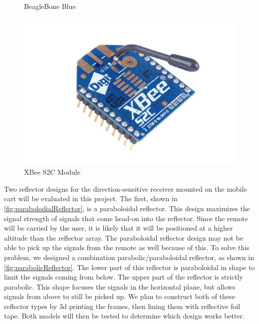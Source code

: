 \documentclass[letterpaper,12pt]{article}   %
\begin{document}
\begin{figure}
\begin{minipage}[t]{0.32\textwidth}
    \captionsetup{width=\textwidth}
    \caption{BeagleBone Blue}
    \label{fig:beagleboneBlue}
  \end{minipage}
  \begin{minipage}[t]{0.32\textwidth}
    \includegraphics[width=1\textwidth]{figs/img/Xbee-S2C-Module}
    \captionsetup{width=\textwidth}
    \caption{XBee S2C Module}
    \label{fig:XBeeModule}
  \end{minipage}
\end{figure}

\vspace*{12pt}
\noindent
Two reflector designs for the direction-sensitive receiver mounted on the mobile cart will be evaluated in this project. The first, shown in \autoref{fig:parabolodialReflector}, is a paraboloidal reflector. This design maximizes the signal strength of signals that come head-on into the reflector. Since the remote will be carried by the user, it is likely that it will be positioned at a higher altitude than the reflector array. The paraboloidal reflector design may not be able to pick up the signals from the remote as well because of this. To solve this problem, we designed a combination parabolic/paraboloidal reflector, as shown in \autoref{fig:parabolicReflector}. The lower part of this reflector is paraboloidal in shape to limit the signals coming from below. The upper part of the reflector is strictly parabolic. This shape focuses the signals in the horizontal plane, but allows signals from above to still be picked up. We plan to construct both of these reflector types by 3d printing the frames, then lining them with reflective foil tape. Both models will then be tested to determine which design works better.
\end{document}
